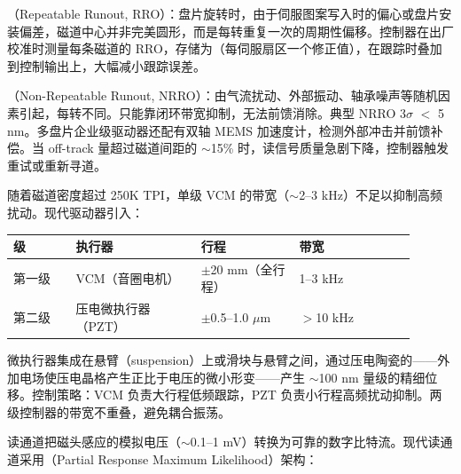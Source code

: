 （Repeatable Runout, RRO）：盘片旋转时，由于伺服图案写入时的偏心或盘片安装偏差，磁道中心并非完美圆形，而是每转重复一次的周期性偏移。控制器在出厂校准时测量每条磁道的 RRO，存储为（每伺服扇区一个修正值），在跟踪时叠加到控制输出上，大幅减小跟踪误差。

（Non-Repeatable Runout, NRRO）：由气流扰动、外部振动、轴承噪声等随机因素引起，每转不同。只能靠闭环带宽抑制，无法前馈消除。典型 NRRO 3$\sigma$ $<$ 5 nm。多盘片企业级驱动器还配有双轴 MEMS 加速度计，检测外部冲击并前馈补偿。当 off-track 量超过磁道间距的 $\sim$15\% 时，读信号质量急剧下降，控制器触发重试或重新寻道。


随着磁道密度超过 250K TPI，单级 VCM 的带宽（$\sim$2--3 kHz）不足以抑制高频扰动。现代驱动器引入：

\begin{longtable}{L{0.14\linewidth}L{0.28\linewidth}L{0.22\linewidth}L{0.26\linewidth}}
\toprule
级 & 执行器 & 行程 & 带宽 \\
\midrule
第一级 & VCM（音圈电机） & $\pm$20 mm（全行程） & 1--3 kHz \\\tablerowrule
第二级 & 压电微执行器（PZT） & $\pm$0.5--1.0 $\mu$m & $>$10 kHz \\
\bottomrule
\end{longtable}

微执行器集成在悬臂（suspension）上或滑块与悬臂之间，通过压电陶瓷的——外加电场使压电晶格产生正比于电压的微小形变——产生 $\sim$100 nm 量级的精细位移。控制策略：VCM 负责大行程低频跟踪，PZT 负责小行程高频扰动抑制。两级控制器的带宽不重叠，避免耦合振荡。


读通道把磁头感应的模拟电压（$\sim$0.1--1 mV）转换为可靠的数字比特流。现代读通道采用（Partial Response Maximum Likelihood）架构：

